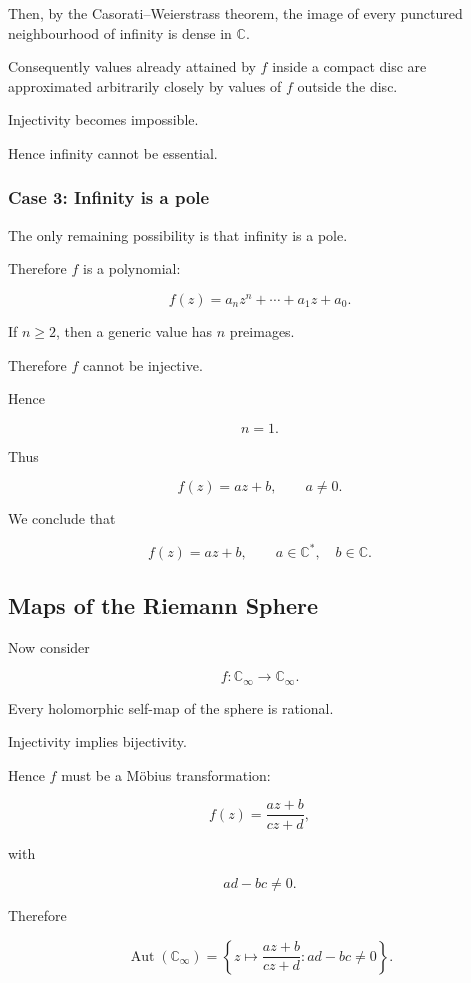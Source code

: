 \documentclass[12pt,a4paper]{article}
\theoremstyle{notespace}
\begin{document}
Then, by the Casorati--Weierstrass theorem, the image of every punctured neighbourhood of infinity is dense in \(\mathbb C\).

Consequently values already attained by \(f\) inside a compact disc are approximated arbitrarily closely by values of \(f\) outside the disc.

Injectivity becomes impossible.

Hence infinity cannot be essential.

\subsubsection*{Case 3: Infinity is a pole}

The only remaining possibility is that infinity is a pole.

Therefore \(f\) is a polynomial:

\[
f(z)
=
a_nz^n+\cdots+a_1z+a_0.
\]

If \(n\ge2\), then a generic value has \(n\) preimages.

Therefore \(f\) cannot be injective.

Hence

\[
n=1.
\]

Thus

\[
f(z)
=
az+b,
\qquad
a\neq0.
\]

We conclude that

\[
\boxed{
	f(z)=az+b,
	\qquad
	a\in\mathbb C^\ast,
	\quad
	b\in\mathbb C.
}
\]

\subsection*{Maps of the Riemann Sphere}

Now consider

\[
f:\mathbb C_\infty\to\mathbb C_\infty.
\]

Every holomorphic self-map of the sphere is rational.

Injectivity implies bijectivity.

Hence \(f\) must be a Möbius transformation:

\[
f(z)
=
\frac{az+b}{cz+d},
\]

with

\[
ad-bc\neq0.
\]

Therefore

\[
\boxed{
	\operatorname{Aut}(\mathbb C_\infty)
	=
	\left\{
	z\mapsto
	\frac{az+b}{cz+d}
	:
	ad-bc\neq0
	\right\}.
}
\]

\bigskip
\end{document}
